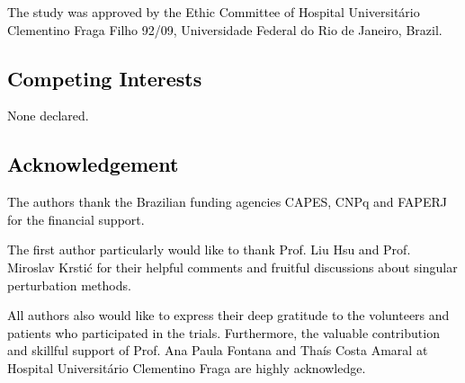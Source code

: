 \documentclass[review]{elsarticle}
\begin{document}
\textcolor{black}{
The study was approved by the Ethic Committee of Hospital Universit\'{a}rio Clementino Fraga Filho 92/09, Universidade Federal do Rio de Janeiro, Brazil.}

\textcolor{black}{
\section*{Competing Interests}
}

\textcolor{black}{
None declared.
}

\textcolor{black}{
\section*{Acknowledgement}
}

\textcolor{black}{
The authors thank the Brazilian funding agencies CAPES, CNPq and FAPERJ for the financial support. 
}

\textcolor{black}{
The first author particularly would like to thank Prof. Liu Hsu and Prof. Miroslav Krsti\'{c} for their helpful comments and fruitful discussions about singular perturbation methods. 
}

\textcolor{black}{
All authors also would like to express their deep gratitude to the volunteers and patients who participated in the trials. Furthermore, the valuable contribution and skillful support of Prof. Ana Paula Fontana and Tha\'{i}s Costa Amaral at Hospital Universit\'{a}rio Clementino Fraga are highly acknowledge.\\
}


%        

%


																				
\end{document}

